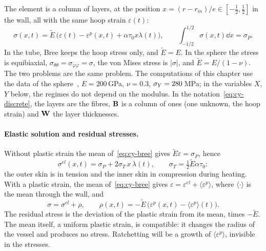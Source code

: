 The element is a column of layers, at the position $x=(r-r_m)/e\in[-\tfrac12,\tfrac12]$
in the wall, all with the same hoop strain $\varepsilon(t)$:
\begin{equation}\label{eq:cy-bree}
  \sigma(x,t)=\tilde E\,\bigl(\varepsilon(t)-\varepsilon^p(x,t)+\alpha\tau_0x\lambda(t)\bigr),
  \qquad
  \int_{-1/2}^{1/2}\sigma(x,t)\dd x=\sigma_P .
\end{equation}
In the tube, Bree keeps the hoop stress only, and $\tilde E=E$. In the sphere
the stress is equibiaxial, $\sigma_{\theta\theta}=\sigma_{\varphi\varphi}=\sigma$,
the von Mises stress is $|\sigma|$, and $\tilde E=E/(1-\nu)$. The two problems are
the same problem. The computations of this chapter use the data of the
sphere~\cite{Maitournam2012c}, $E=200$\,GPa, $\nu=0.3$, $\sigma_{Y}=280$\,MPa; in the
variables $X$, $Y$ below, the regimes do not depend on the modulus. In the
notation~\eqref{eq:cy-discrete}, the layers are the fibres, $\mathbf{B}$ is a column
of ones (one unknown, the hoop strain) and $\mathbf{W}$ the layer thicknesses.

\paragraph{Elastic solution and residual stresses.}
Without plastic strain the mean of~\eqref{eq:cy-bree} gives
$\tilde E\varepsilon=\sigma_P$, hence
\begin{equation}\label{eq:cy-bree-el}
  \sigma^{el}(x,t)=\sigma_P+2\sigma_T\,x\,\lambda(t),\qquad
  \sigma_T=\tfrac12\tilde E\alpha\tau_0 :
\end{equation}
the outer skin is in tension and the inner skin in compression during
heating. With a plastic strain, the mean of~\eqref{eq:cy-bree} gives
$\varepsilon=\varepsilon^{el}+\langle\varepsilon^p\rangle$, where
$\langle\cdot\rangle$ is the mean through the wall, and
\begin{equation}\label{eq:cy-bree-melan}
  \sigma=\sigma^{el}+\rho,\qquad
  \rho(x,t)=-\tilde E\,\bigl(\varepsilon^p(x,t)-\langle\varepsilon^p\rangle(t)\bigr).
\end{equation}
The residual stress is the deviation of the plastic strain from its mean,
times $-\tilde E$. The mean itself, a uniform plastic strain, is compatible:
it changes the radius of the vessel and produces no stress. Ratchetting will
be a growth of $\langle\varepsilon^p\rangle$, invisible in the stresses.

